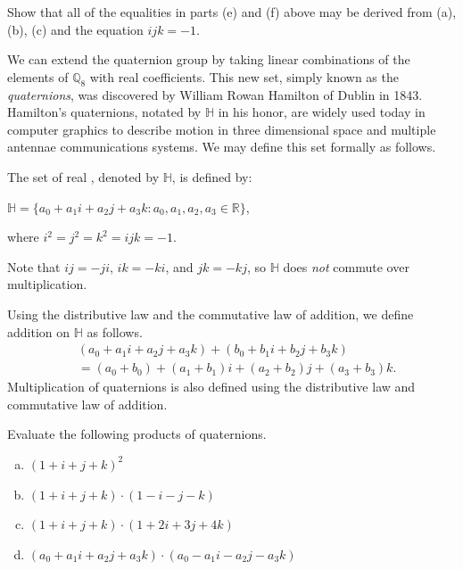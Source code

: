 \begin{exercise}{}
Show that all of the equalities in parts (e) and (f) above may be derived from (a), (b), (c) and the equation $ijk=-1$. 
\end{exercise}

We can extend the quaternion group by taking linear combinations of the elements of ${\mathbb Q}_8$ with real coefficients.  This new set, simply known as the \emph{quaternions}, was discovered by William Rowan Hamilton of Dublin in 1843.  Hamilton's quaternions, notated by ${\mathbb H}$ in his honor, are widely used today in computer graphics to describe motion in three dimensional space and multiple antennae communications systems.  We may define this set formally as follows.

\begin{defn}\label{quaternionring}
The set of real , denoted by ${\mathbb H}$, is defined by:
\begin{center}
${\mathbb H}=\{a_0+a_1i+a_2j+a_3k:a_0,a_1,a_2,a_3\in {\mathbb R}\}$,

where $i^2=j^2=k^2=ijk=-1$.
\end{center}

Note that $ij=-ji$, $ik=-ki$, and $jk=-kj$, so ${\mathbb H}$ does \emph{not} commute over multiplication.

Using the distributive law and the commutative law of addition, we define addition on ${\mathbb H}$ as follows.
\begin{equation}
\begin{aligned}
&(a_0+a_1i+a_2j+a_3k)+(b_0+b_1i+b_2j+b_3k)\\
&=(a_0+b_0)+(a_1+b_1)i+(a_2+b_2)j+(a_3+b_3)k.
\end{aligned}
\end{equation}
Multiplication of quaternions is also defined using the distributive law and commutative law of addition.
\end{defn}

\begin{exercise}{}
Evaluate the following products of quaternions.
\begin{enumerate}[(a)]
\item $(1+i+j+k)^2$
\item $(1+i+j+k)\cdot (1-i-j-k)$
\item $(1+i+j+k) \cdot (1+2i+3j+4k)$
\item $(a_0+a_1i+a_2j+a_3k)\cdot (a_0-a_1i-a_2j-a_3k)$
\end{enumerate}
\end{exercise}


